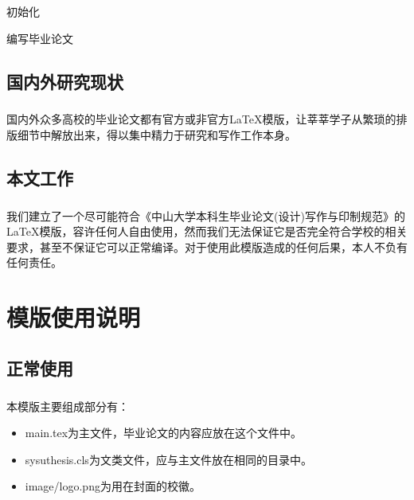 ﻿\documentclass{sysuthesis}
\begin{document}
\begin{algorithm}[H]
初始化\;
\caption{编写毕业论文}
\label{algor:write}
\end{algorithm}

\section{国内外研究现状}

\paragraph{}国内外众多高校的毕业论文都有官方或非官方\LaTeX 模版，让莘莘学子从繁琐的排版细节中解放出来，得以集中精力于研究和写作工作本身。 

\section{本文工作}

\paragraph{}我们建立了一个尽可能符合《中山大学本科生毕业论文(设计)写作与印制规范》的\LaTeX 模版，容许任何人自由使用，然而我们无法保证它是否完全符合学校的相关要求，甚至不保证它可以正常编译。对于使用此模版造成的任何后果，本人不负有任何责任。

\chapter{模版使用说明}

\section{正常使用}

\paragraph{}本模版主要组成部分有：

\begin{itemize}
\item {\ttfamily main.tex}为主文件，毕业论文的内容应放在这个文件中。
\item {\ttfamily sysuthesis.cls}为文类文件，应与主文件放在相同的目录中。
\item {\ttfamily image/logo.png}为用在封面的校徽。
\end{itemize}
\end{document}
